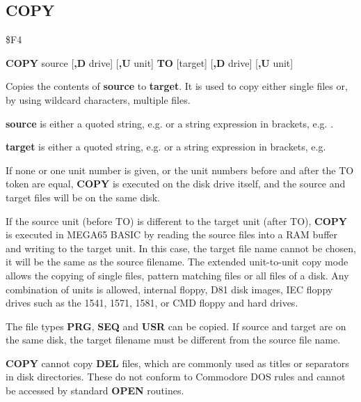 \subsection{COPY}
\begin{description}[leftmargin=2cm,style=nextline]
\item [Token:] \$F4
\item [Format:] {\bf COPY} source [{\bf,D} drive] [{\bf,U} unit] {\bf TO}
                [target] [{\bf ,D} drive] [{\bf ,U} unit]
\item [Usage:]
   Copies the contents of
   {\bf source} to {\bf target}.
   It is used to copy either single files or, by using
   wildcard characters, multiple files.

   {\bf source} is either a quoted string, e.g.  or
   a string expression in brackets, e.g. .

   {\bf target} is either a quoted string, e.g.  or
   a string expression in brackets, e.g. 

   \drivedefinition

   \unitdefinition

   If none or one unit number is given, or the unit numbers before and after
   the TO token are equal, {\bf COPY} is executed on the disk drive
   itself, and the source and target files will be on the same disk.

   If the source unit (before TO) is different to the target unit (after TO),
   {\bf COPY} is executed in MEGA65 BASIC by reading the source
   files into a RAM buffer and writing to the target unit. In this case,
   the target file name cannot be chosen, it will be the same as the
   source filename. The extended unit-to-unit copy mode allows the copying of
   single files, pattern matching files or all files of a disk.
   Any combination of units is allowed, internal floppy, D81 disk images,
   IEC floppy drives such as the 1541, 1571, 1581, or CMD floppy and hard drives.

\item [Remarks:]
   The file types {\bf PRG}, {\bf SEQ} and {\bf USR} can be copied.
   If source and target are on the same disk, the target filename
   must be different from the source file name.

   {\bf COPY} cannot copy {\bf DEL} files, which are commonly used
   as titles or separators in disk directories. These do not conform to
   Commodore DOS rules and cannot be accessed by standard {\bf OPEN} routines.


\end{description}
